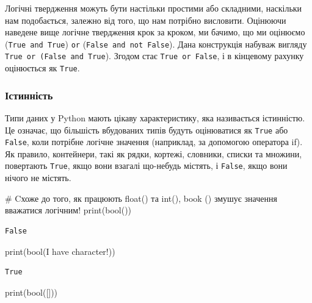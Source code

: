 \documentclass[
  letterpaper,
]{report}
\newenvironment{Shaded}{\begin{snugshade}}{\end{snugshade}}
\newcommand{\BuiltInTok}[1]{\textcolor[rgb]{0.00,0.23,0.31}{#1}}
\newcommand{\CommentTok}[1]{\textcolor[rgb]{0.37,0.37,0.37}{#1}}
\newcommand{\NormalTok}[1]{\textcolor[rgb]{0.00,0.23,0.31}{#1}}
\newcommand{\StringTok}[1]{\textcolor[rgb]{0.13,0.47,0.30}{#1}}
\begin{document}
Логічні твердження можуть бути настільки простими або складними,
наскільки нам подобається, залежно від того, що нам потрібно висловити.
Оцінюючи наведене вище логічне твердження крок за кроком, ми бачимо, що
ми оцінюємо (\texttt{True\ and\ True}) \texttt{or}
(\texttt{False\ and\ not\ False}). Дана конструкція набуваж вигляду
\texttt{True\ or\ (False\ and\ True}). Згодом стає
\texttt{True\ or\ False}, і в кінцевому рахунку оцінюється як
\texttt{True}.

\hypertarget{ux456ux441ux442ux438ux43dux43dux456ux441ux442ux44c}{%
\subsubsection{Істинність}\label{ux456ux441ux442ux438ux43dux43dux456ux441ux442ux44c}}

Типи даних у Python мають цікаву характеристику, яка називається
істинністю. Це означає, що більшість вбудованих типів будуть оцінюватися
як \texttt{True} або \texttt{False}, коли потрібне логічне значення
(наприклад, за допомогою оператора if). Як правило, контейнери, такі як
рядки, кортежі, словники, списки та множини, повертають \texttt{True},
якщо вони взагалі що-небудь містять, і \texttt{False}, якщо вони нічого
не містять.

\begin{Shaded}
\begin{Highlighting}[]
\CommentTok{\# Cхоже до того, як працюють float() та int(), book () змушує значення вважатися логічним!}
\BuiltInTok{print}\NormalTok{(}\BuiltInTok{bool}\NormalTok{(}\StringTok{\textquotesingle{}\textquotesingle{}}\NormalTok{))}
\end{Highlighting}
\end{Shaded}

\begin{verbatim}
False
\end{verbatim}

\begin{Shaded}
\begin{Highlighting}[]
\BuiltInTok{print}\NormalTok{(}\BuiltInTok{bool}\NormalTok{(}\StringTok{\textquotesingle{}I have character!\textquotesingle{}}\NormalTok{))}
\end{Highlighting}
\end{Shaded}

\begin{verbatim}
True
\end{verbatim}

\begin{Shaded}
\begin{Highlighting}[]
\BuiltInTok{print}\NormalTok{(}\BuiltInTok{bool}\NormalTok{([]))}
\end{Highlighting}
\end{Shaded}
\end{document}
